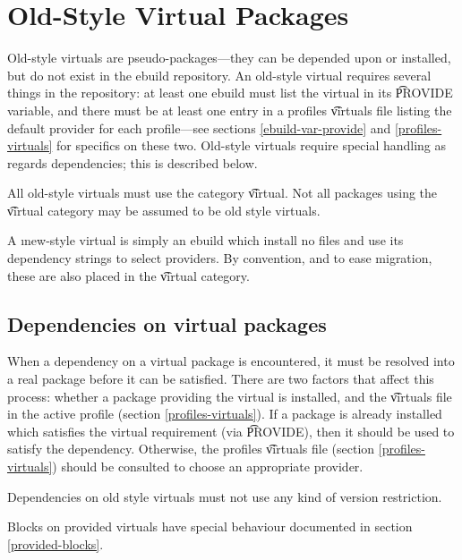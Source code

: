 \chapter{Old-Style Virtual Packages}
\label{old-virtuals}

Old-style virtuals are pseudo-packages---they can be depended upon or installed, but do not exist in
the ebuild repository.  An old-style virtual requires several things in the repository: at least one
ebuild must list the virtual in its \t{PROVIDE} variable, and there must be at least one entry in a
profiles \t{virtuals} file listing the default provider for each profile---see sections
\ref{ebuild-var-provide} and \ref{profiles-virtuals} for specifics on these two. Old-style virtuals
require special handling as regards dependencies; this is described below.

All old-style virtuals must use the category \t{virtual}. Not all packages using the \t{virtual}
category may be assumed to be old style virtuals.

\note A \i{new-style} virtual is simply an ebuild which install no files and use its dependency
strings to select providers. By convention, and to ease migration, these are also placed in the
\t{virtual} category.

\section{Dependencies on virtual packages}

When a dependency on a virtual package is encountered, it must be resolved into a real package
before it can be satisfied. There are two factors that affect this process: whether a package
providing the virtual is installed, and the \t{virtuals} file in the active profile (section
\ref{profiles-virtuals}). If a package is already installed which satisfies the virtual requirement
(via \t{PROVIDE}), then it should be used to satisfy the dependency. Otherwise, the profiles
\t{virtuals} file (section \ref{profiles-virtuals}) should be consulted to choose an appropriate
provider.

Dependencies on old style virtuals must not use any kind of version restriction.

Blocks on provided virtuals have special behaviour documented in section \ref{provided-blocks}.


